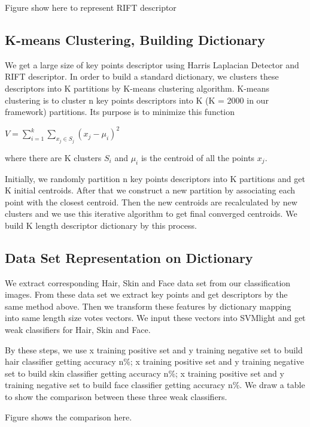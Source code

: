 \documentclass[10pt,twocolumn,letterpaper]{article}
\begin{document}
Figure show here to represent RIFT descriptor

\subsection{K-means Clustering, Building Dictionary}
We get a large size of key points descriptor using Harris Laplacian Detector and RIFT descriptor. In order to build a standard dictionary, we clusters these descriptors into K partitions by K-means clustering algorithm. K-means clustering is to cluster n key points descriptors into K (K = 2000 in our framework) partitions. Its purpose is to minimize this function

$V=\sum_{i=1}^{k}\sum_{x_{j}\in S_{j}}(x_{j}-\mu_{i})^{2}$

where there are K clusters $S_{i}$ and $\mu_{i}$ is the centroid of all the points $x_{j}$.

Initially, we randomly partition n key points descriptors into K partitions and get K initial centroids. After that we construct a new partition by associating each point with the closest centroid. Then the new centroids are recalculated by new clusters and we use this iterative algorithm to get final converged centroids. We build K length descriptor dictionary by this process.

\subsection{Data Set Representation on Dictionary}
We extract corresponding Hair, Skin and Face data set from our classification images. From these data set we extract key points and get descriptors by the same method above. Then we transform these features by dictionary mapping into same
length size votes vectors. We input these vectors into SVMlight and get weak classifiers for Hair, Skin and Face. 

By these steps, we use x training positive set and y training negative set to build hair classifier getting accuracy n\%;
x training positive set and y training negative set to build skin classifier getting accuracy n\%;
x training positive set and y training negative set to build face classifier getting accuracy n\%.
We draw a table to show the comparison between these three weak classifiers.

Figure shows the comparison here.
\end{document}
